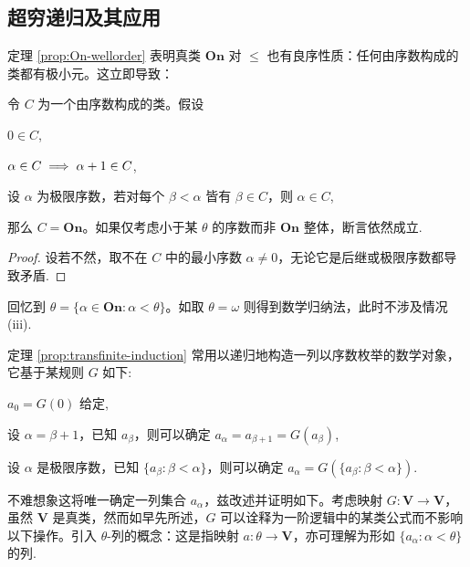 \subsection{超穷递归及其应用}
定理 \ref{prop:On-wellorder} 表明真类 $\mathbf{On}$ 对 $\leqslant$ 也有良序性质：任何由序数构成的类都有极小元。这立即导致：
\begin{theorem}\label{prop:transfinite-induction}
	令 $C$ 为一个由序数构成的类。假设
	\begin{compactenum}[(i)]
		\item $0 \in C$,
		\item $\alpha \in C \implies \alpha+1 \in C$,
		\item 设 $\alpha$ 为极限序数，若对每个 $\beta < \alpha$ 皆有 $\beta \in C$，则 $\alpha \in C$,
	\end{compactenum}
	那么 $C = \mathbf{On}$。如果仅考虑小于某 $\theta$ 的序数而非 $\mathbf{On}$ 整体，断言依然成立.
\end{theorem}
\begin{proof}
	设若不然，取不在 $C$  中的最小序数 $\alpha \neq 0$，无论它是后继或极限序数都导致矛盾.
\end{proof}
\begin{remark}
	回忆到 $\theta = \{\alpha \in \mathbf{On}: \alpha < \theta \}$。如取 $\theta = \omega$ 则得到数学归纳法，此时不涉及情况 (iii).
\end{remark}

定理 \ref{prop:transfinite-induction} 常用以递归地构造一列以序数枚举的数学对象，它基于某规则 $G$ 如下:
\begin{compactdesc}
	\item[第零项] $a_0 = G(0)$ 给定,
	\item[后继项] 设 $\alpha = \beta+1$，已知 $a_\beta$，则可以确定 $a_\alpha = a_{\beta + 1} = G(a_\beta)$,
	\item[极限项] 设 $\alpha$ 是极限序数，已知 $\{a_\beta : \beta < \alpha \}$，则可以确定 $a_\alpha = G(\{a_\beta : \beta < \alpha \})$.
\end{compactdesc}
不难想象这将唯一确定一列集合 $a_\alpha$，兹改述并证明如下。考虑映射 $G: \mathbf{V} \to \mathbf{V}$，虽然 $\mathbf{V}$ 是真类，然而如早先所述，$G$ 可以诠释为一阶逻辑中的某类公式而不影响以下操作。引入 $\theta$-列的概念：这是指映射 $a: \theta \to \mathbf{V}$，亦可理解为形如 $\{a_\alpha : \alpha < \theta \}$ 的列.

